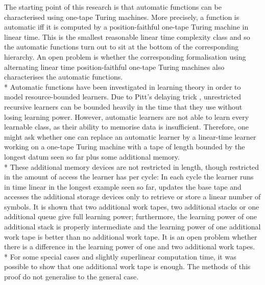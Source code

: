 \documentclass{LMCS}
\theoremstyle{plain}\newtheorem{athm}[thm]{Theorem}
\theoremstyle{plain}\newtheorem{aprop}[thm]{Proposition}
\theoremstyle{plain}\newtheorem{aprob}[thm]{Open Problem}
\theoremstyle{plain}\newtheorem{acor}[thm]{Corollary}
\theoremstyle{plain}\newtheorem{alem}[thm]{Lemma}
\theoremstyle{definition}\newtheorem{adefn}[thm]{Definition}
\theoremstyle{definition}\newtheorem{arem}[thm]{Remark}
\theoremstyle{plain}\newtheorem{aexmp}[thm]{Example}
\theoremstyle{plain}\newtheorem{aclm}[thm]{Claim}
\def\sp{\\*\indent}
\begin{document}
\noindent
The starting point of this research is that automatic functions can be
characterised using one-tape Turing machines. More precisely, a function
is automatic iff it is computed by a position-faithful one-tape Turing
machine in linear time. This is the smallest reasonable linear time
complexity class and so the automatic functions turn out to sit at the
bottom of the corresponding hierarchy. An open problem is whether the
corresponding formalisation using alternating linear time position-faithful
one-tape Turing machines also characterises the automatic functions.
\sp
Automatic functions have been investigated in learning theory in order
to model resource-bounded learners. Due to Pitt's delaying trick \cite{Pi89},
unrestricted recursive learners can be bounded heavily in the time
that they use without
losing learning power. However,
automatic learners are not able to learn every learnable class, as their
ability to memorise data is insufficient. Therefore, one might ask
whether one can replace an automatic learner by a linear-time learner
working on a one-tape Turing machine with a tape of length bounded
by the longest datum seen so far plus some additional memory.
\sp
These additional memory devices are not restricted in length, 
though restricted in
the amount of access the learner has per cycle: In each cycle the learner
runs in time linear in the longest example seen so far, updates the
base tape and accesses the additional storage devices only to retrieve
or store a linear number of symbols. It is shown that two additional work
tapes, two additional stacks or one additional queue give full learning
power; furthermore, the learning power of one additional stack is properly
intermediate and the learning power of one additional work tape is better
than no additional work tape. It is an open problem whether there is a
difference in the learning power of one and two additional work tapes.
\sp
For some special cases and slightly superlinear computation time, it
was possible to show that one additional work tape is enough. The methods
of this proof do not generalise to the general case.
\end{document}

